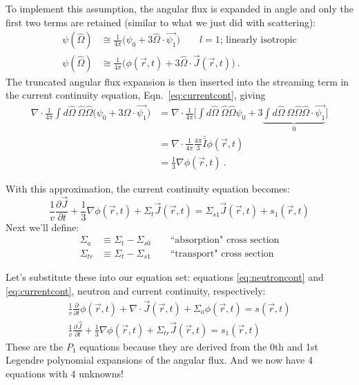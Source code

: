 \documentclass[12pt]{article}
\newcommand{\vOmega}{\ensuremath{\hat{\Omega}}}
\begin{document}
To implement this assumption, the angular flux is expanded in angle and only the first two terms are retained (similar to what we just did with scattering):  
%
\begin{align*}
\psi(\vOmega) &\cong  \frac{1}{4\pi}\bigl( \psi_{0} + 3\vOmega \cdot \vec{\psi_{1}} \bigr) \qquad l=1 \text{; linearly isotropic} \\
%
\psi(\vOmega) &\cong \frac{1}{4\pi}\bigl(\phi(\vec{r}, t) + 3 \vOmega \cdot \vec{J}(\vec{r}, t)\bigr) \:.
\end{align*}
The truncated angular flux expansion is then inserted into the streaming term in the current continuity equation, Eqn.\ \eqref{eq:currentcont}, giving 
%
\begin{align*}
  \nabla \cdot \frac{1}{4\pi} \int d \vOmega \:\vOmega \vOmega  \bigl(\psi_{0} + 3\vOmega \cdot \vec{\psi_{1}}\bigr) &=  
%
\nabla \cdot \frac{1}{4\pi} \bigl[\int d \vOmega \:\vOmega \vOmega  \psi_{0}
%
+ 3 \underbrace{\int d \vOmega \:\vOmega \vOmega \vOmega \cdot \vec{\psi_{1}}}_{0} \bigr] \nonumber \\
% 
&= \nabla \cdot \frac{1}{4\pi} \frac{4\pi}{3}\bar{\bar{I}} \phi(\vec{r}, t) \\
%
  &= \frac{1}{3} \nabla \phi(\vec{r}, t) \:.
\end{align*}

With this approximation, the current continuity equation becomes:
\begin{equation}
\frac{1}{v}\frac{\partial \vec{J}}{\partial t} 
+ \frac{1}{3} \nabla \phi(\vec{r}, t) +
\Sigma_t  \vec{J}(\vec{r}, t) =
\Sigma_{s1} \vec{J}(\vec{r},t)
+ s_{1}(\vec{r}, t) \nonumber
\end{equation}
%
Next we'll define:
\begin{align*}
\Sigma_a &\equiv \Sigma_t - \Sigma_{s0} \qquad \text{``absorption" cross section}\\
\Sigma_{tr} &\equiv \Sigma_t - \Sigma_{s1} \qquad \text{``transport" cross section}
\end{align*}

Let's substitute these into our equation set: equations \eqref{eq:neutroncont} and \eqref{eq:currentcont}, neutron and current continuity, respectively:
%
\begin{align*}
\frac{1}{v}\frac{\partial}{\partial t}\phi(\vec{r}, t) + 
\nabla \cdot \vec{J}(\vec{r}, t) + 
\Sigma_a \phi(\vec{r}, t) =
s(\vec{r}, t) \\
%
\frac{1}{v}\frac{\partial \vec{J}}{\partial t} 
+ \frac{1}{3} \nabla \phi(\vec{r}, t) +
\Sigma_{tr}  \vec{J}(\vec{r}, t) =
s_{1}(\vec{r}, t) 
\end{align*}
%
These are the $P_1$ equations because they are derived from the 0th and 1st Legendre polynomial expansions of the angular flux. And we now have 4 equations with 4 unknowns!
\end{document}
